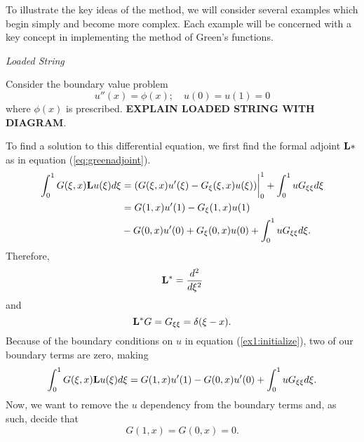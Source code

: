 To illustrate the key ideas of the method, we will consider several examples which begin simply and become more complex. Each example will be concerned with a key concept in implementing the method of Green's functions.
\begin{example} %
    \textit{Loaded String}
    
    Consider the boundary value problem
    \begin{equation} \label{ex1:initialize}
        u''(x) = \phi(x);\quad u(0)=u(1)=0
    \end{equation}
    where \(\phi(x)\) is prescribed. \textbf{EXPLAIN LOADED STRING WITH DIAGRAM}. 
    
    To find a solution to this differential equation, we first find the formal adjoint \(\mathrm{\bf{L}}*\) as in equation (\ref{eq:greenadjoint}). 
    \begin{equation}
        \begin{split}
            \int_{0}^{1} G(\xi, x)\mathrm{\bf{L}} u(\xi) d\xi  &= (G(\xi, x)u'(\xi)-G_\xi (\xi, x)u(\xi))\biggr\rvert_0^1 + \int_{0}^{1} uG_{\xi\xi}d\xi\\
            &= G(1, x)u'(1) - G_\xi(1, x)u(1) \\&- G(0, x)u'(0) + G_\xi(0,x)u(0) + \int_{0}^{1} uG_{\xi\xi}d\xi.
        \end{split}
    \end{equation}
    Therefore, 
    \begin{equation}
        \mathrm{\bf{L^*}} = \frac{d^2}{d\xi^2}
    \end{equation}
    and 
    \begin{equation}
        \mathrm{\bf{L^*}} G = G_{\xi\xi} = \delta(\xi-x).
    \end{equation}
    Because of the boundary conditions on \(u\) in equation (\ref{ex1:initialize}), two of our boundary terms are zero, making
    \begin{equation}
        \int_{0}^{1} G(\xi, x)\mathrm{\bf{L}} u(\xi) d\xi = G(1, x)u'(1) - G(0, x)u'(0) + \int_{0}^{1} uG_{\xi\xi}d\xi.
    \end{equation}
    Now, we want to remove the \(u\) dependency from the boundary terms and, as such, decide that
    \begin{equation}
        G(1,x) = G(0,x) = 0.
    \end{equation}
\end{example}
